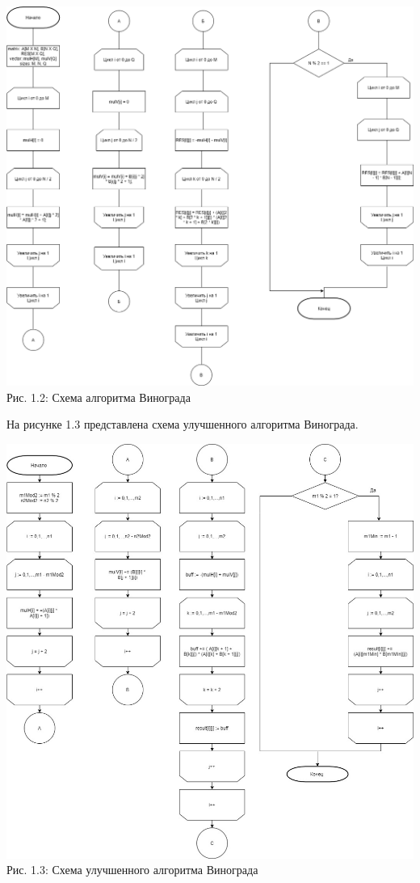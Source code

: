 \documentclass[12pt,a4paper]{article}
\numberwithin{equation}{section}
\begin{document}
\begin{center}	
	\includegraphics[width=1\linewidth]{src/schemas/vinograd_default}\\
	Рис. 1.2: Схема алгоритма Винограда
\end{center}
\clearpage
На рисунке 1.3 представлена схема улучшенного алгоритма Винограда.
\begin{center}
	\includegraphics[width=1\linewidth]{src/schemas/vinograd_modified}\\
	Рис. 1.3: Схема улучшенного алгоритма Винограда
\end{center}
\end{document}
